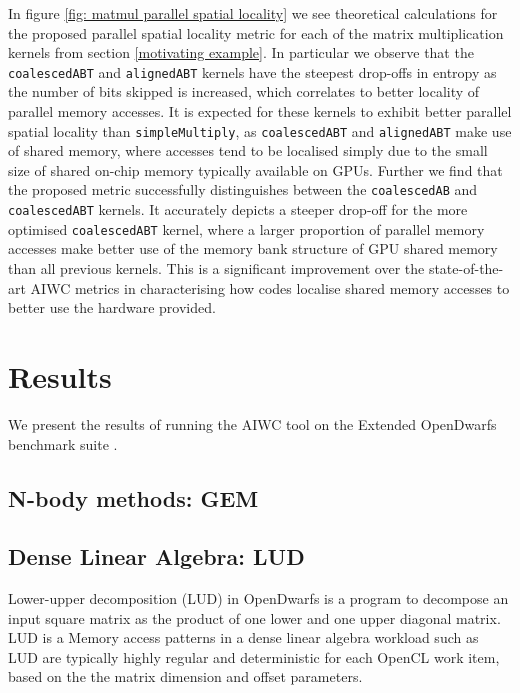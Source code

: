 \documentclass[review=false, sigchi]{acmart}
\begin{document}
	In figure \ref{fig: matmul parallel spatial locality} we see theoretical calculations for the proposed parallel spatial locality metric for each of the matrix multiplication kernels from section \ref{motivating example}. In particular we observe that the \texttt{coalescedABT} and \texttt{alignedABT} kernels have the steepest drop-offs in entropy as the number of bits skipped is increased, which correlates to better locality of parallel memory accesses. It is expected for these kernels to exhibit better parallel spatial locality than \texttt{simpleMultiply}, as \texttt{coalescedABT} and \texttt{alignedABT} make use of shared memory, where accesses tend to be localised simply due to the small size of shared on-chip memory typically available on GPUs. Further we find that the proposed metric successfully distinguishes between the \texttt{coalescedAB} and \texttt{coalescedABT} kernels. It accurately depicts a steeper drop-off for the more optimised \texttt{coalescedABT} kernel, where a larger proportion of parallel memory accesses make better use of the memory bank structure of GPU shared memory than all previous kernels. This is a significant improvement over the state-of-the-art AIWC metrics in characterising how codes localise shared memory accesses to better use the hardware provided.
	
	\section{Results}
	
	We present the results of running the AIWC tool on the Extended OpenDwarfs benchmark suite \cite{opendwarfs2017base,extendedopendwarfs}.
	
	\subsection{N-body methods: GEM}
	
	\subsection{Dense Linear Algebra: LUD}
	
	Lower-upper decomposition (LUD) in OpenDwarfs is a program to decompose an input square matrix as the product of one lower and one upper diagonal matrix. LUD is a Memory access patterns in a dense linear algebra workload such as LUD are typically highly regular and deterministic for each OpenCL work item, based on the the matrix dimension and offset parameters.
	
\end{document}
